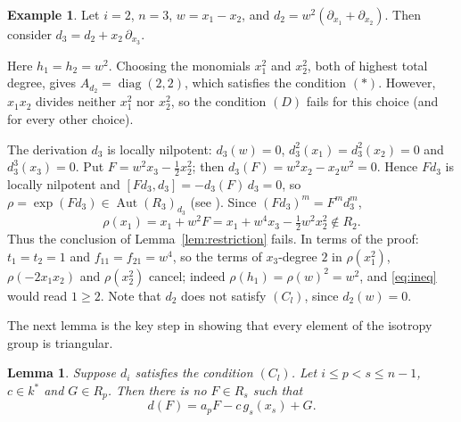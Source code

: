 \documentclass[11pt]{amsart}
\newtheorem{lemma}[theorem]{Lemma}
\theoremstyle{definition}
\newtheorem{example}[theorem]{Example}
\theoremstyle{remark}
\numberwithin{equation}{theorem}
\newcommand{\Aut}{\operatorname{Aut}}
\begin{document}
\begin{example}\label{ex:necessity}
Let $i=2$, $n=3$, $w=x_1-x_2$, and $d_2=w^2(\partial_{x_1}+\partial_{x_2})$. Then consider $d_3=d_2+x_2\,\partial_{x_3}$.

Here $h_1=h_2=w^2$. Choosing the monomials $x_1^2$ and $x_2^2$, both of highest total degree, gives
$A_{d_2}=\operatorname{diag}(2,2)$, which satisfies the condition $(\ast)$. However, $x_1x_2$ divides neither $x_1^2$
nor $x_2^2$, so the condition $(D)$ fails for this choice (and for every other choice).

The derivation $d_3$ is locally nilpotent: $d_3(w)=0$, $d_3^2(x_1)=d_3^2(x_2)=0$ and
$d_3^3(x_3)=0$. Put $F=w^2x_3-\tfrac12x_2^2$; then $d_3(F)=w^2x_2-x_2w^2=0$. Hence $Fd_3$ is locally
nilpotent and $[Fd_3,d_3]=-d_3(F)\,d_3=0$, so $\rho=\exp(Fd_3)\in\Aut(R_3)_{d_3}$
(see \cite{Fre17}). Since $(Fd_3)^m=F^md_3^m$,
\[
\rho(x_1)=x_1+w^2F=x_1+w^4x_3-\tfrac12w^2x_2^2\notin R_2 .
\]
Thus the conclusion of Lemma~\ref{lem:restriction} fails. In terms of the proof: $t_1=t_2=1$ and
$f_{11}=f_{21}=w^4$, so the terms of $x_3$-degree $2$ in $\rho(x_1^2)$, $\rho(-2x_1x_2)$ and
$\rho(x_2^2)$ cancel; indeed $\rho(h_1)=\rho(w)^2=w^2$, and \eqref{eq:ineq} would read $1\ge2$.
Note that $d_2$ does not satisfy $(C_l)$, since $d_2(w)=0$.
\end{example}

The next lemma is the key step in showing that every element of the isotropy group is triangular.

\begin{lemma}\label{lem:Ps}
Suppose $d_i$ satisfies the condition $(C_l)$. Let $i\le p<s\le n-1$, $c\in k^*$ and $G\in R_p$. Then there is no
$F\in R_s$ such that
\begin{equation}\label{eq:Ps}
d(F)=a_pF-c\,g_s(x_s)+G .
\end{equation}
\end{lemma}
\end{document}
